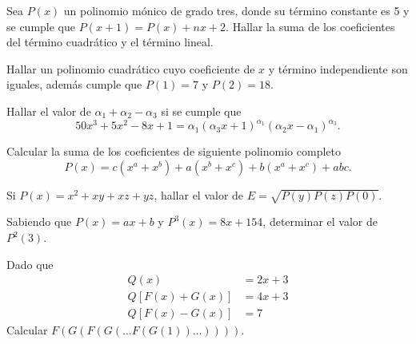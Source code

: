 \begin{multicols}{2}
    \begin{problem}
        Sea $P(x)$ un polinomio mónico de grado tres, donde su término constante es 5 y se cumple que $P(x + 1) = P(x) + nx + 2$.
        Hallar la suma de los coeficientes del término cuadrático y el término lineal.
    \end{problem}

    \begin{problem}
        Hallar un polinomio cuadrático cuyo coeficiente de $x$ y término independiente son iguales, además cumple que $P(1) = 7$ y $P(2) = 18$.
    \end{problem}

    \begin{problem}
        Hallar el valor de $\alpha_1 + \alpha_2 - \alpha_3$ si se cumple que
        \[
            50x^3 + 5x^2 - 8x + 1 = \alpha_1 (\alpha_3 x + 1)^{\alpha_1} (\alpha_2 x - \alpha_1)^{\alpha_3}.
        \]
    \end{problem}

    \begin{problem}
        Calcular la suma de los coeficientes de siguiente polinomio completo
        \[
            P(x) = c(x^a + x^b) + a(x^b + x^c) + b(x^a + x^c) + abc.
        \]
    \end{problem}

    \begin{problem}
        Si $P(x) = x^2 + xy + xz + yz$, hallar el valor de $E = \sqrt {P(y)P(z)P(0)}$.
    \end{problem}

    \begin{problem}
        Sabiendo que $P(x) = ax + b$ y $P^3(x) = 8x + 154$, determinar el valor de $P^2(3)$.
    \end{problem}

    \begin{problem}
        Dado que
        \begin{align*}
            Q(x) &= 2x + 3 \\
            Q\left[ F(x) + G(x) \right] &= 4x + 3 \\
            Q\left[ F(x) - G(x) \right] &= 7
        \end{align*}
        Calcular $F(G(F(G(\dots F(G(1))\dots))))$.
    \end{problem}
\end{multicols}